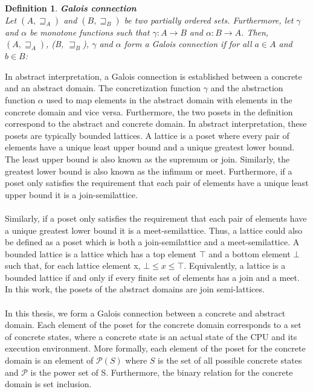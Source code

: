 \documentclass{kththesis}
\newtheorem*{definition}{Definition}
\begin{document}
\begin{definition} \textbf{Galois connection}\\
Let $(A, \sqsupseteq_A)$ and $(B, \sqsupseteq_B)$ be two partially ordered sets. Furthermore, let $\gamma$ and $\alpha$ be monotone functions such that  $\gamma : A \rightarrow B$ and $\alpha : B \rightarrow A$. Then, ${(A, \sqsupseteq_A)}$, (B, $\sqsupseteq_B$), $\gamma$ and $\alpha$ form a Galois connection if for all $a \in A$ and $b \in B$:
\end{definition}
\noindent
In abstract interpretation, a Galois connection is established between a concrete and an abstract domain. The concretization function $\gamma$ and the abstraction function $\alpha$ used to map elements in the abstract domain with elements in the concrete domain and vice versa. Furthermore, the two posets in the definition correspond to the abstract and concrete domain. In abstract interpretation, these posets are typically bounded lattices.
\clearpage
\noindent
A lattice is a poset where every pair of elements have a unique least upper bound and a unique greatest lower bound. The least upper bound is also known as the supremum or join. Similarly, the greatest lower bound is also known as the infimum or meet. Furthermore, if a poset only satisfies the requirement that each pair of elements have a unique least upper bound it is a join-semilattice.
\\ \\
Similarly, if a poset only satisfies the requirement that each pair of elements have a unique greatest lower bound it is a meet-semilattice. Thus, a lattice could also be defined as a poset which is both a join-semilattice and a meet-semilattice. A bounded lattice is a lattice which has a top element $\top$ and a bottom element $\bot$ such that, for each lattice element x, $\bot \leq x \leq \top$. Equivalently, a lattice is a bounded lattice if and only if every finite set of elements has a join and a meet. In this work, the posets of the abstract domains are join semi-lattices.
\\ \\
In this thesis, we form a Galois connection between a concrete and abstract domain. Each element of the poset for the concrete domain corresponds to a set of concrete states, where a concrete state is an actual state of the CPU and its execution environment. More formally, each element of the poset for the concrete domain is an element of $\mathcal{P}(S)$ where $S$ is the set of all possible concrete states and $\mathcal{P}$ is the power set of S. Furthermore, the binary relation for the concrete domain is set inclusion. 
\end{document}
